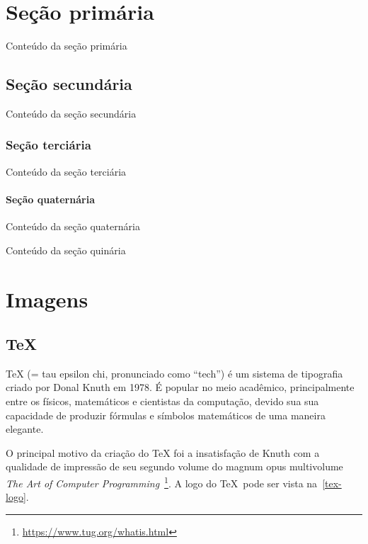 \documentclass[
	12pt,    %
	oneside, %
	a4paper, %
	chapter=TITLE, %
	section=TITLE, %
	sumario=tradicional, %
	english, %
	brazil   %
] {abntex2}
\begin{document}
	\chapter{Seção primária}\label{sec:primaria}

	Conteúdo da seção primária	
	
	\section{Seção secundária}\label{sec:secundaria}
	
	Conteúdo da seção secundária
	
	\subsection{Seção terciária}\label{sec:terciária}
	
	Conteúdo da seção terciária
	
	\subsubsection{Seção quaternária}\label{sec:quaternária}
	
	Conteúdo da seção quaternária
	
	\label{sec:quinária}
	
	Conteúdo da seção quinária
	
	\chapter{Imagens}\label{sec:imagens}
	\section{TeX}
	TeX (= tau epsilon chi, pronunciado como \enquote{tech}) é um sistema de tipografia criado por Donal Knuth em 1978. É popular no meio acadêmico, principalmente entre os físicos, matemáticos e cientistas da computação, devido sua sua capacidade de produzir fórmulas e símbolos matemáticos de uma maneira elegante.
	
	O principal motivo da criação do TeX foi a insatisfação de Knuth com a qualidade de impressão de seu segundo volume do magnum opus multivolume \textit{The Art of Computer Programming}~\footnote{\url{https://www.tug.org/whatis.html}}. A logo do \TeX \ pode ser vista na~\autoref{tex-logo}.
	
\end{document}

